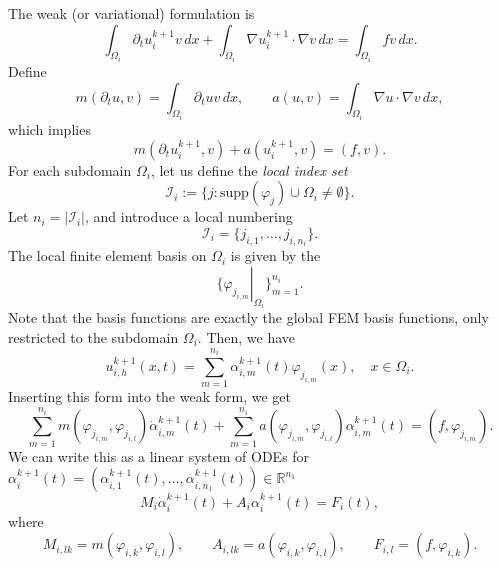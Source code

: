 \documentclass[a4paper, 11pt]{article}
\theoremstyle{plain}
\theoremstyle{definition}
\theoremstyle{remark}
\begin{document}
The weak (or variational) formulation is
\begin{equation*}
    \int_{\Omega_{i}}\partial_{t} u_{i}^{k+1} v\,dx + \int_{\Omega_{i}}\nabla u_{i}^{k+1} \cdot \nabla v\,dx = \int_{\Omega_{i}}fv\,dx.
\end{equation*}
Define
\begin{equation*}
    m(\partial_{t} u, v) = \int_{\Omega_{i}}\partial_{t} u v\,dx, \qquad a(u, v) = \int_{\Omega_{i}}\nabla u \cdot \nabla v\,dx, 
\end{equation*}
which implies
\begin{equation*}
    m(\partial_{t} u_{i}^{k+1}, v) + a(u_{i}^{k+1}, v) = (f, v).
\end{equation*}
For each subdomain $\Omega_{i}$, let us define the \textit{local index set}
\begin{equation*}
    \mathcal{I}_{i} := \{j: \text{supp}(\varphi_{j})\cup \Omega_{i} \neq \emptyset\}.
\end{equation*}
Let $n_{i} = \lvert \mathcal{I}_{i}\rvert$, and introduce a local numbering
\begin{equation*}
    \mathcal{I}_{i} = \{j_{i, 1}, \ldots, j_{i, n_{i}}\}.
\end{equation*}
The local finite element basis on $\Omega_{i}$ is given by the 
\begin{equation*}
    \{\left.\varphi_{j_{i, m}}\right|_{\Omega_{i}}\}^{n_{i}}_{m=1}.
\end{equation*}
Note that the basis functions are exactly the global FEM basis functions, only restricted to the subdomain $\Omega_{i}$. Then, we have
\begin{equation*}
    u^{k+1}_{i, h}(x, t) = \sum_{m = 1}^{n_i}\alpha^{k+1}_{i, m}(t)\varphi_{j_{i, m}}(x), \quad x\in \Omega_{i}.
\end{equation*}
Inserting this form into the weak form, we get
\begin{equation*}
    \sum_{m = 1}^{n_i}m(\varphi_{j_{i, m}}, \varphi_{j_{i, l}})\dot{\alpha}^{k+1}_{i, m}(t) + \sum_{m = 1}^{n_i}a(\varphi_{j_{i, m}}, \varphi_{j_{i, l}})\alpha^{k+1}_{i, m}(t) = (f, \varphi_{j_{i, m}}).
\end{equation*}
We can write this as a linear system of ODEs for $\alpha_{i}^{k+1}(t) = (\alpha^{k+1}_{i, 1}(t), \ldots, \alpha^{k+1}_{i, n_{1}}(t))\in \mathbb{R}^{n_{1}}$
\begin{equation*}
    M_{i}\dot{\alpha}_{i}^{k+1}(t) + A_{i}\alpha_{i}^{k+1}(t) = F_{i}(t),
\end{equation*}
where
\begin{equation*}
    M_{i, lk} = m(\varphi_{i, k}, \varphi_{i, l}), \qquad A_{i, lk} = a(\varphi_{i, k}, \varphi_{i, l}), \qquad F_{i, l} = (f, \varphi_{i, k}).
\end{equation*}
\end{document}
